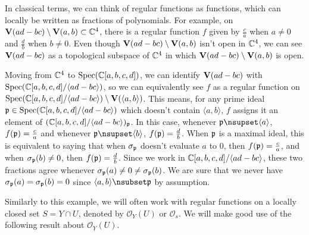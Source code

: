 \begin{example}\label{ex:reg_fun}\upshape
  In classical terms, we can think of regular functions as functions, which can locally be written as fractions of polynomials. For example, on $\operatorname{\mathbf V}(ad - bc) \setminus \operatorname{\mathbf V}(a, b) \subset \mathbb{C}^{4}$, there is a regular function $f$ given by $\frac c a$ when $a \neq 0$ and $\frac d b$ when $b \neq 0$. Even though $\operatorname{\mathbf V}(ad - bc) \setminus \operatorname{\mathbf V}(a, b)$ isn't open in $\mathbb{C}^{4}$, we can see $\operatorname{\mathbf V}(ad - bc)$ as a topological subspace of $\mathbb{C}^{4}$ in which $\operatorname{\mathbf V}(ad - bc) \setminus \operatorname{\mathbf V}(a, b)$ is open.

  Moving from $\mathbb{C}^{4}$ to $\operatorname{Spec}(\mathbb{C}[a, b, c, d])$, we can identify $\operatorname{\mathbf V}(ad - bc)$ with $\operatorname{Spec}(\mathbb{C}[a, b, c, d]/\langle ad - bc \rangle)$, so we can equivalently see $f$ as a regular function on $\operatorname{Spec}(\mathbb{C}[a, b, c, d]/\langle ad - bc \rangle) \setminus \operatorname{\mathbf V}(\langle a, b \rangle)$. This means, for any prime ideal $\mathfrak p \in \operatorname{Spec}(\mathbb{C}[a, b, c, d]/\langle ad - bc \rangle)$ which doesn't contain $\langle a, b \rangle$, $f$ assigns it an element of $(\mathbb{C}[a, b, c, d]/\langle ad - bc \rangle)_{\mathfrak p}$. In this case, whenever $\p \nsupset \langle a \rangle$, $f(\mathfrak p) = \frac c a$ and whenever $\p \nsupset \langle b \rangle$, $f(\mathfrak p) = \frac d b$. When $\mathfrak p$ is a maximal ideal, this is equivalent to saying that when $\sigma_{\mathfrak p}$ doesn't evaluate $a$ to 0, then $f(\mathfrak p) = \frac c a$, and when $\sigma_{\mathfrak p}(b) \neq 0$, then $f(\mathfrak p) = \frac d b$. Since we work in $\mathbb{C}[a, b, c, d]/\langle ad - bc \rangle$, these two fractions agree whenever $\sigma_{\mathfrak p}(a) \neq 0 \neq \sigma_{\mathfrak p}(b)$. We are sure that we never have $\sigma_{\mathfrak p}(a) = \sigma_{\mathfrak p}(b) = 0$ since $\langle a, b \rangle \nsubset \p$ by assumption.
\end{example}

Similarly to this example, we will often work with regular functions on a locally closed set $S = Y \cap U$, denoted by $\mathcal O_{Y}(U)$ or $\mathcal O_{s}$. We will make good use of the following result about $\mathcal O_{Y}(U)$.

